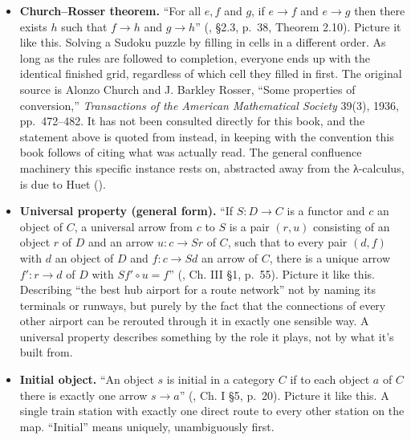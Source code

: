 \begin{itemize}
  \textbf{Weak head normal form.} ``Weak Head Normal Form, all expressions which are either λ-abstractions or of the form \(\lambda x_1 \ldots \lambda x_n.\, y\, e_1 \ldots e_m\)'' (\cite{Thompson1991}, §2.3, p.~36, Definition 2.8). Picture it like this. Telling a wrapped gift is bicycle-shaped without unwrapping it, reduced just far enough to see the outermost shape (a function, or a specific constructor applied to arguments), without bothering to look inside those arguments yet.
\item
  \textbf{Church--Rosser theorem.} ``For all \(e, f\) and \(g\), if \(e \to f\) and \(e \to g\) then there exists \(h\) such that \(f \to h\) and \(g \to h\)'' (\cite{Thompson1991}, §2.3, p.~38, Theorem 2.10). Picture it like this. Solving a Sudoku puzzle by filling in cells in a different order. As long as the rules are followed to completion, everyone ends up with the identical finished grid, regardless of which cell they filled in first. The original source is Alonzo Church and J. Barkley Rosser, ``Some properties of conversion,'' \emph{Transactions of the American Mathematical Society} 39(3), 1936, pp.~472--482. It has not been consulted directly for this book, and the statement above is quoted from \cite{Thompson1991} instead, in keeping with the convention this book follows of citing what was actually read. The general confluence machinery this specific instance rests on, abstracted away from the λ-calculus, is due to Huet (\cite{Huet1980}).
\item
  \textbf{Universal property (general form).} ``If \(S : D \to C\) is a functor and \(c\) an object of \(C\), a universal arrow from \(c\) to \(S\) is a pair \((r, u)\) consisting of an object \(r\) of \(D\) and an arrow \(u : c \to Sr\) of \(C\), such that to every pair \((d, f)\) with \(d\) an object of \(D\) and \(f : c \to Sd\) an arrow of \(C\), there is a unique arrow \(f' : r \to d\) of \(D\) with \(Sf' \circ u = f\)'' (\cite{MacLane1998}, Ch. III §1, p.~55). Picture it like this. Describing ``the best hub airport for a route network'' not by naming its terminals or runways, but purely by the fact that the connections of every other airport can be rerouted through it in exactly one sensible way. A universal property describes something by the role it plays, not by what it's built from.
\item
  \textbf{Initial object.} ``An object \(s\) is initial in a category \(C\) if to each object \(a\) of \(C\) there is exactly one arrow \(s \to a\)'' (\cite{MacLane1998}, Ch. I §5, p.~20). Picture it like this. A single train station with exactly one direct route to every other station on the map. ``Initial'' means uniquely, unambiguously first.

\end{itemize}

